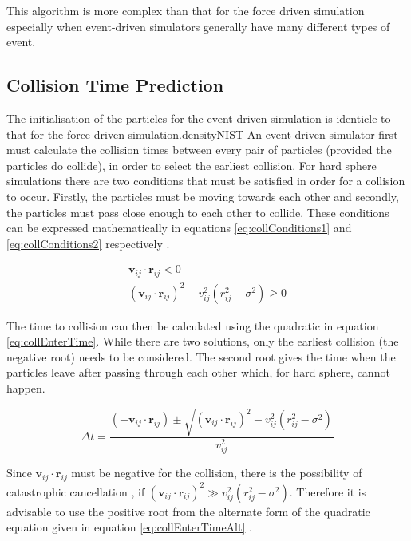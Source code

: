 \documentclass[12pt]{UoAthesis}
\begin{document}
This algorithm is more complex than that for the force driven
simulation especially when event-driven simulators generally have many
different types of event.


\subsection{Collision Time Prediction}
The initialisation of the particles for the event-driven simulation is
identicle to that for the force-driven simulation.densityNIST An event-driven
simulator first must calculate the collision times between every pair
of particles (provided the particles do collide), in order to select
the earliest collision.  For hard sphere simulations there are two
conditions that must be satisfied in order for a collision to occur.
Firstly, the particles must be moving towards each other and secondly,
the particles must pass close enough to each other to collide.  These
conditions can be expressed mathematically in equations
\eqref{eq:collConditions1} and \eqref{eq:collConditions2} respectively
\cite{Haile1997}.

\begin{subequations}
  \begin{align}
    \mathbf{v}_{ij}\cdot\mathbf{r}_{ij} < 0 \label{eq:collConditions1}\\
    (\mathbf{v}_{ij}\cdot\mathbf{r}_{ij})^2 
    - v_{ij}^2(r_{ij}^2 - \sigma^2) \geq 0 \label{eq:collConditions2}
  \end{align}
\end{subequations}

The time to collision can then be calculated using the quadratic in
equation \eqref{eq:collEnterTime}.  While there are two solutions,
only the earliest collision (the negative root) needs to be
considered.  The second root gives the time when the particles leave
after passing through each other which, for hard sphere, cannot
happen.

\begin{equation}
\Delta t = \frac{(-\mathbf{v}_{ij}\cdot\mathbf{r}_{ij}) \pm 
  \sqrt{(\mathbf{v}_{ij}\cdot\mathbf{r}_{ij})^2 - v_{ij}^2(r_{ij}^2 - \sigma^2)}}
       {v_{ij}^2} \label{eq:collEnterTime}
\end{equation}

Since $\mathbf{v}_{ij}\cdot\mathbf{r}_{ij}$ must be negative for the
collision, there is the possibility of catastrophic cancellation
\cite{Goldberg1991}, if $(\mathbf{v}_{ij}\cdot\mathbf{r}_{ij})^2 \gg
v_{ij}^2(r_{ij}^2 - \sigma^2)$. Therefore it is advisable to use the
positive root from the alternate form of the quadratic equation given
in equation \eqref{eq:collEnterTimeAlt} \cite{Poschel2005}.
\end{document}
